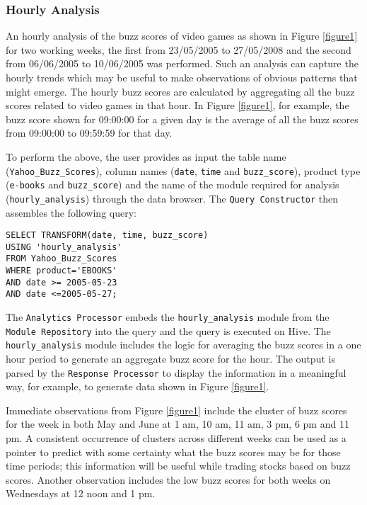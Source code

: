 \documentclass[10pt, conference, compsocconf]{IEEEtran}
\begin{document}
\subsubsection{Hourly Analysis}
An hourly analysis of the buzz scores of video games as shown in Figure \ref{figure1} for two working weeks, the first from 23/05/2005 to 27/05/2008 and the second from 06/06/2005 to 10/06/2005 was performed. Such an analysis can capture the hourly trends which may be useful to make observations of obvious patterns that might emerge. The hourly buzz scores are calculated by aggregating all the buzz scores related to video games in that hour. In Figure \ref{figure1}, for example, the buzz score shown for 09:00:00 for a given day is the average of all the buzz scores from 09:00:00 to 09:59:59 for that day.

To perform the above, the user provides as input the table name (\texttt{Yahoo\_Buzz\_Scores}), column names (\texttt{date}, \texttt{time} and \texttt{buzz\_score}), product type (\texttt{e-books} and \texttt{buzz\_score}) and the name of the module required for analysis (\texttt{hourly\_analysis}) through the data browser. The \texttt{Query Constructor} then assembles the following query:

\begin{verbatim}
SELECT TRANSFORM(date, time, buzz_score) 
USING 'hourly_analysis' 
FROM Yahoo_Buzz_Scores 
WHERE product='EBOOKS' 
AND date >= 2005-05-23 
AND date <=2005-05-27;
\end{verbatim}

The \texttt{Analytics Processor} embeds the \texttt{hourly\_analysis} module from the \texttt{Module Repository} into the query and the query is executed on Hive. The \texttt{hourly\_analysis} module includes the logic for averaging the buzz scores in a one hour period to generate an aggregate buzz score for the hour. The output is parsed by the \texttt{Response Processor} to display the information in a meaningful way, for example, to generate data shown in Figure \ref{figure1}. 

Immediate observations from Figure \ref{figure1} include the cluster of buzz scores for the week in both May and June at 1 am, 10 am, 11 am, 3 pm, 6 pm and 11 pm. A consistent occurrence of clusters across different weeks can be used as a pointer to predict with some certainty what the buzz scores may be for those time periods; this information will be useful while trading stocks based on buzz scores. Another observation includes the low buzz scores for both weeks on Wednesdays at 12 noon and 1 pm.   
\end{document}
